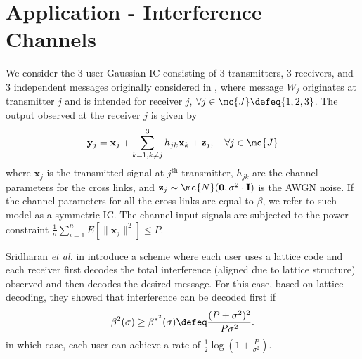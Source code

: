 \documentclass[conference]{IEEEtran}
\begin{document}
\section{Application - Interference Channels}
We consider the 3 user Gaussian IC consisting of 3 transmitters, 3 receivers, and 3 independent messages originally considered in \cite{sridharan2008capacity}, where message $W_{j}$ originates at transmitter $j$ and is intended for receiver $j$, $\forall j\in \mc{J}\defeq\{1,2,3\}$. The output observed at the receiver $j$ is given by
\begin{align}\label{SymmInterfChannel}
    \mathbf{y}_{j}=\mathbf{x}_{j}+ \sum^{3}_{k=1,k\neq j}h_{jk}\mathbf{x}_{k}+\mathbf{z}_{j}, \hspace{10pt} \forall j\in \mc{J}
\end{align}
where $\mathbf{x}_{j}$ is the transmitted signal at $j^{\text{th}}$ transmitter, $h_{jk}$ are the channel parameters for the cross links, and $\mathbf{z}_{j}\sim\mc{N}(\mathbf{0},\sigma^{2}\cdot \mathbf{I})$ is the AWGN noise. If the channel parameters for all the cross links are equal to $\beta$, we refer to such model as a symmetric IC. The channel input signals are subjected to the power constraint
$\frac{1}{n}\sum_{i=1}^{n}E\left[\|\mathbf{x}_{j}\|^2\right]\leq P$.


Sridharan \textit{et al.} in \cite{sridharan2008capacity} introduce a scheme where each user uses a lattice code and each receiver first decodes the total interference (aligned due to lattice structure) observed and then decodes the desired message. For this case, based on lattice decoding, they showed that interference can be decoded first if
\begin{align}
\beta^{2}(\sigma)\geq \beta^{*^{2}}(\sigma)\defeq\frac{(P+\sigma^{2})^{2}}{P\sigma^{2}}.
\label{Eqn:StrongInterfCondition2}
\end{align}
in which case, each user can achieve a rate of $\frac{1}{2}\log(1+\frac{P}{\sigma^{2}})$.
\end{document}
